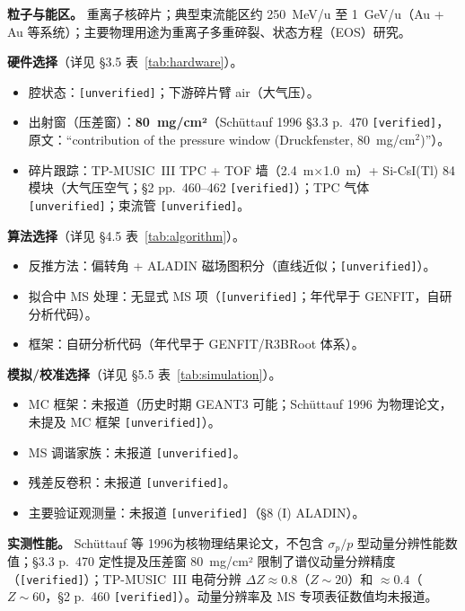 \documentclass[a4paper, 11pt]{article}
\begin{document}
\textbf{粒子与能区。}
重离子核碎片；典型束流能区约 250~MeV/u 至 1~GeV/u（Au + Au 等系统）；主要物理用途为重离子多重碎裂、状态方程（EOS）研究。

\textbf{硬件选择}（详见 §3.5 表~\ref{tab:hardware}）。
\begin{itemize}[leftmargin=2em,itemsep=0pt]
\item 腔状态：\texttt{[unverified]}；下游碎片臂 air（大气压）。
\item 出射窗（压差窗）：\textbf{80~mg/cm²}（Schüttauf 1996 §3.3 p.~470 \texttt{[verified]}，原文：``contribution of the pressure window (Druckfenster, 80~mg/cm$^2$)''）。
\item 碎片跟踪：TP-MUSIC~III TPC + TOF 墙（2.4~m$\times$1.0~m）+ Si-CsI(Tl) 84 模块（大气压空气；§2 pp.~460--462 \texttt{[verified]}）；TPC 气体 \texttt{[unverified]}；束流管 \texttt{[unverified]}。
\end{itemize}

\textbf{算法选择}（详见 §4.5 表~\ref{tab:algorithm}）。
\begin{itemize}[leftmargin=2em,itemsep=0pt]
\item 反推方法：偏转角 + ALADIN 磁场图积分（直线近似；\texttt{[unverified]}）。
\item 拟合中 MS 处理：无显式 MS 项（\texttt{[unverified]}；年代早于 GENFIT，自研分析代码）。
\item 框架：自研分析代码（年代早于 GENFIT/R3BRoot 体系）。
\end{itemize}

\textbf{模拟/校准选择}（详见 §5.5 表~\ref{tab:simulation}）。
\begin{itemize}[leftmargin=2em,itemsep=0pt]
\item MC 框架：未报道（历史时期 GEANT3 可能；Schüttauf 1996 为物理论文，未提及 MC 框架 \texttt{[unverified]}）。
\item MS 调谐家族：未报道 \texttt{[unverified]}。
\item 残差反卷积：未报道 \texttt{[unverified]}。
\item 主要验证观测量：未报道 \texttt{[unverified]}（§8 (I) ALADIN）。
\end{itemize}

\textbf{实测性能。}
Schüttauf 等 1996为核物理结果论文，不包含 $\sigma_p/p$ 型动量分辨性能数值；§3.3 p.~470 定性提及压差窗 80~mg/cm² 限制了谱仪动量分辨精度（\texttt{[verified]}）；TP-MUSIC~III 电荷分辨 $\Delta Z \approx 0.8$（$Z \sim 20$）和 $\approx 0.4$（$Z \sim 60$，§2 p.~460 \texttt{[verified]}）。动量分辨率及 MS 专项表征数值均未报道。
\end{document}
